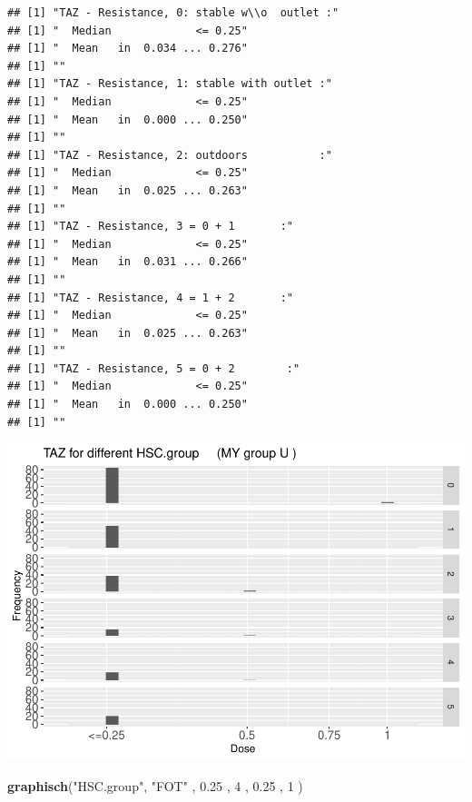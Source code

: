 \documentclass[
]{article}
\newenvironment{Shaded}{\begin{snugshade}}{\end{snugshade}}
\newcommand{\DecValTok}[1]{\textcolor[rgb]{0.00,0.00,0.81}{#1}}
\newcommand{\FloatTok}[1]{\textcolor[rgb]{0.00,0.00,0.81}{#1}}
\newcommand{\KeywordTok}[1]{\textcolor[rgb]{0.13,0.29,0.53}{\textbf{#1}}}
\newcommand{\NormalTok}[1]{#1}
\newcommand{\StringTok}[1]{\textcolor[rgb]{0.31,0.60,0.02}{#1}}
\begin{document}
\begin{verbatim}
## [1] "TAZ - Resistance, 0: stable w\\o  outlet :"
## [1] "  Median             <= 0.25"
## [1] "  Mean   in  0.034 ... 0.276"
## [1] ""
## [1] "TAZ - Resistance, 1: stable with outlet :"
## [1] "  Median             <= 0.25"
## [1] "  Mean   in  0.000 ... 0.250"
## [1] ""
## [1] "TAZ - Resistance, 2: outdoors           :"
## [1] "  Median             <= 0.25"
## [1] "  Mean   in  0.025 ... 0.263"
## [1] ""
## [1] "TAZ - Resistance, 3 = 0 + 1       :"
## [1] "  Median             <= 0.25"
## [1] "  Mean   in  0.031 ... 0.266"
## [1] ""
## [1] "TAZ - Resistance, 4 = 1 + 2       :"
## [1] "  Median             <= 0.25"
## [1] "  Mean   in  0.025 ... 0.263"
## [1] ""
## [1] "TAZ - Resistance, 5 = 0 + 2        :"
## [1] "  Median             <= 0.25"
## [1] "  Mean   in  0.000 ... 0.250"
## [1] ""
\end{verbatim}

\includegraphics{Verteilungen_files/figure-latex/unnamed-chunk-50-1.pdf}

\begin{Shaded}
\begin{Highlighting}[]
  \KeywordTok{graphisch}\NormalTok{(}\StringTok{"HSC.group"}\NormalTok{, }\StringTok{"FOT"}\NormalTok{ , }\FloatTok{0.25}\NormalTok{ ,   }\DecValTok{4}\NormalTok{   ,   }\FloatTok{0.25}\NormalTok{ ,   }\DecValTok{1}\NormalTok{    )  }
\end{Highlighting}
\end{Shaded}
\end{document}
